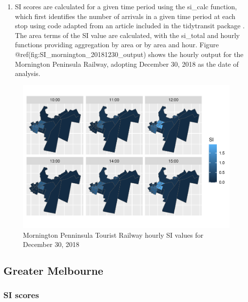 \documentclass[preprint, 3p,
authoryear]{elsarticle} %
\providecommand{\tightlist}{%
  \setlength{\itemsep}{0pt}\setlength{\parskip}{0pt}}
\begin{document}
\begin{enumerate}
\def\labelenumi{(\arabic{enumi})}
\setcounter{enumi}{4}
\tightlist
\item
  SI scores are calculated for a given time period using the si\_calc
  function, which first identifies the number of arrivals in a given
  time period at each stop using code adapted from an article included
  in the tidytransit package \citep{tidytransit_departure_timetable}.
  The area terms of the SI value are calculated, with the si\_total and
  hourly functions providing aggregation by area or by area and hour.
  Figure @ref(fig:SI\_mornington\_20181230\_output) shows the hourly
  output for the Mornington Peninsula Railway, adopting December 30,
  2018 as the date of analysis.
\end{enumerate}

\begin{figure}
\centering
\includegraphics{Leveraging_GTFS_to_assess_transit_supply_Transport_Geography_files/figure-latex/SI_mornington_20181230_output-1.pdf}
\caption{Mornington Penninsula Tourist Railway hourly SI values for
December 30, 2018}
\end{figure}

\subsection{Greater Melbourne}\label{greater-melbourne}

\subsubsection{SI scores}\label{si-scores}
\end{document}
